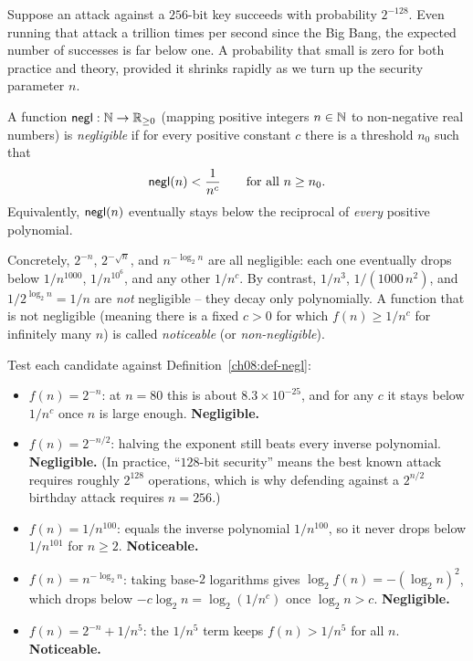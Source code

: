 Suppose an attack against a $256$-bit key succeeds with probability $2^{-128}$. Even running that attack a trillion times per second since the Big Bang, the expected number of successes is far below one. A probability that small is zero for both practice and theory, provided it shrinks rapidly as we turn up the security parameter $n$.

\begin{definition}
\label{ch08:def-negl}
A function $\mathsf{negl} : \mathbb{N} \to \mathbb{R}_{\ge 0}$ (mapping positive integers $n \in \mathbb{N}$ to non-negative real numbers) is \emph{negligible} if for every positive constant $c$ there is a threshold $n_0$ such that
\[
\mathsf{negl}(n) < \frac{1}{n^{c}} \qquad \text{for all } n \ge n_0.
\]
Equivalently, $\mathsf{negl}(n)$ eventually stays below the reciprocal of \emph{every} positive polynomial.
\end{definition}

Concretely, $2^{-n}$, $2^{-\sqrt{n}}$, and $n^{-\log_2 n}$ are all negligible: each one eventually drops below $1/n^{1000}$, $1/n^{10^6}$, and any other $1/n^{c}$. By contrast, $1/n^{3}$, $1/(1000\,n^2)$, and $1/2^{\log_2 n} = 1/n$ are \emph{not} negligible -- they decay only polynomially. A function that is not negligible (meaning there is a fixed $c > 0$ for which $f(n) \ge 1/n^c$ for infinitely many $n$) is called \emph{noticeable} (or \emph{non-negligible}).

\begin{example}
\label{ch08:ex-negl}
Test each candidate against Definition~\ref{ch08:def-negl}:
\begin{itemize}
\item $f(n) = 2^{-n}$: at $n=80$ this is about $8.3 \times 10^{-25}$, and for any $c$ it stays below $1/n^c$ once $n$ is large enough. \textbf{Negligible.}
\item $f(n) = 2^{-n/2}$: halving the exponent still beats every inverse polynomial. \textbf{Negligible.} (In practice, ``$128$-bit security'' means the best known attack requires roughly $2^{128}$ operations, which is why defending against a $2^{n/2}$ birthday attack requires $n = 256$.)
\item $f(n) = 1/n^{100}$: equals the inverse polynomial $1/n^{100}$, so it never drops below $1/n^{101}$ for $n \ge 2$. \textbf{Noticeable.}
\item $f(n) = n^{-\log_2 n}$: taking base-$2$ logarithms gives $\log_2 f(n) = -(\log_2 n)^2$, which drops below $-c\log_2 n = \log_2(1/n^c)$ once $\log_2 n > c$. \textbf{Negligible.}
\item $f(n) = 2^{-n} + 1/n^{5}$: the $1/n^5$ term keeps $f(n) > 1/n^5$ for all $n$. \textbf{Noticeable.}
\end{itemize}
\end{example}

